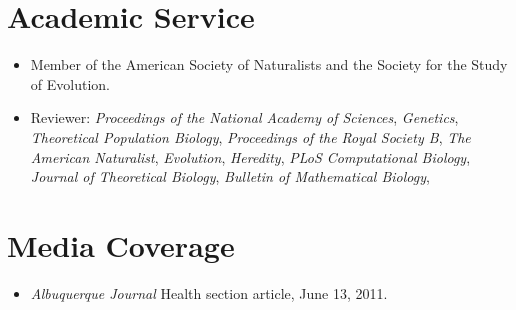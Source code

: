 \documentclass[11pt]{article}
\begin{document}

  \section{Academic Service}
  \begin{itemize}
  \item Member of the American Society of Naturalists and the Society for the Study of Evolution.
  \item Reviewer: \textit{Proceedings of the National Academy of Sciences}, \textit{Genetics}, \textit{Theoretical Population Biology}, \textit{Proceedings of the Royal Society B}, \textit{The American Naturalist}, \textit{Evolution}, \textit{Heredity}, \textit{PLoS Computational Biology}, \textit{Journal of Theoretical Biology}, \textit{Bulletin of Mathematical Biology},
  \end{itemize}
  

  \section{Media Coverage}
  \begin{itemize}
  \item \textit{Albuquerque Journal} Health section article, June 13, 2011.
  \end{itemize}


  \pagestyle{fancy}
\end{document}
